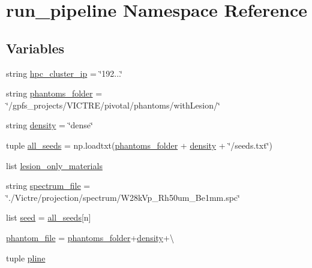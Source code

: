 \hypertarget{namespacerun__pipeline}{\section{run\-\_\-pipeline Namespace Reference}
\label{namespacerun__pipeline}
}
\subsection*{Variables}
\begin{DoxyCompactItemize}
\item 
string \hyperlink{namespacerun__pipeline_aa14c4b2755be317ff6b122e4e340e3ad}{hpc\-\_\-cluster\-\_\-ip} = \char`\"{}192...\char`\"{}
\item 
string \hyperlink{namespacerun__pipeline_ad2c440e7163ff7674972217024c82f44}{phantoms\-\_\-folder} = \char`\"{}/gpfs\-\_\-projects/V\-I\-C\-T\-R\-E/pivotal/phantoms/with\-Lesion/\char`\"{}
\item 
string \hyperlink{namespacerun__pipeline_ae61cb02024dfca7d93506ffb8033e069}{density} = \char`\"{}dense\char`\"{}
\item 
tuple \hyperlink{namespacerun__pipeline_a15bae38d22aeec6a0d47fa8cade55406}{all\-\_\-seeds} = np.\-loadtxt(\hyperlink{namespacerun__pipeline_ad2c440e7163ff7674972217024c82f44}{phantoms\-\_\-folder} + \hyperlink{namespacerun__pipeline_ae61cb02024dfca7d93506ffb8033e069}{density} + \char`\"{}/seeds.\-txt\char`\"{})
\item 
list \hyperlink{namespacerun__pipeline_ae33763f2d174b8a12c1a4d6de9c514d3}{lesion\-\_\-only\-\_\-materials}
\item 
string \hyperlink{namespacerun__pipeline_ab0c872cc0ac374f364881c1b8c53be2f}{spectrum\-\_\-file} = \char`\"{}./Victre/projection/spectrum/W28k\-Vp\-\_\-\-Rh50um\-\_\-\-Be1mm.\-spc\char`\"{}
\item 
list \hyperlink{namespacerun__pipeline_a0ea10c437dacefc9eb6e69b098f7124d}{seed} = \hyperlink{namespacerun__pipeline_a15bae38d22aeec6a0d47fa8cade55406}{all\-\_\-seeds}\mbox{[}n\mbox{]}
\item 
\hyperlink{namespacerun__pipeline_a52ad572b0cc10acfe4c6f92accf792c8}{phantom\-\_\-file} = \hyperlink{namespacerun__pipeline_ad2c440e7163ff7674972217024c82f44}{phantoms\-\_\-folder}+\hyperlink{namespacerun__pipeline_ae61cb02024dfca7d93506ffb8033e069}{density}+\textbackslash{}
\item 
tuple \hyperlink{namespacerun__pipeline_a27b743dac5fef240f9c04a8664ebe49c}{pline}
\item 

\end{DoxyCompactItemize}
